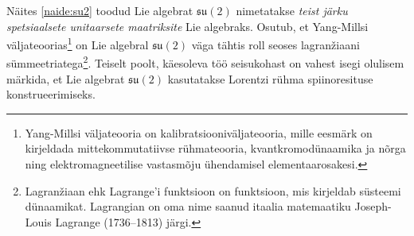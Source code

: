 \documentclass[12pt,a4paper,oneside]{article}
\theoremstyle{plain}
\theoremstyle{definition}
\numberwithin{equation}{section}
\def\su2{{\mathfrak{ su}\left(2\right)}}
\begin{document}
Näites \ref{naide:su2} toodud Lie algebrat $\su2$ nimetatakse 
\emph{teist järku spetsiaalsete unitaarsete maatriksite} Lie 
algebraks. Osutub, et Yang-Millsi väljateoorias\footnote{Yang-Millsi 
väljateooria on kalibratsiooniväljateooria, mille eesmärk on 
kirjeldada mittekommutatiivse rühmateooria, kvantkromodünaamika ja 
nõrga ning elektromagneetilise vastasmõju ühendamisel 
elementaarosakesi.} on Lie algebral $\su2$ väga tähtis roll seoses 
lagranžiaani sümmeetriatega\footnote{Lagranžiaan ehk Lagrange'i 
funktsioon on funktsioon, mis kirjeldab süsteemi dünaamikat. 
Lagrangian on oma nime saanud itaalia matemaatiku Joseph-Louis 
Lagrange (1736--1813) järgi.}. Teiselt poolt, käesoleva töö 
seisukohast on vahest isegi olulisem märkida, et Lie algebrat $\su2$ 
kasutatakse Lorentzi rühma spiinoresituse konstrueerimiseks.
\end{document}
